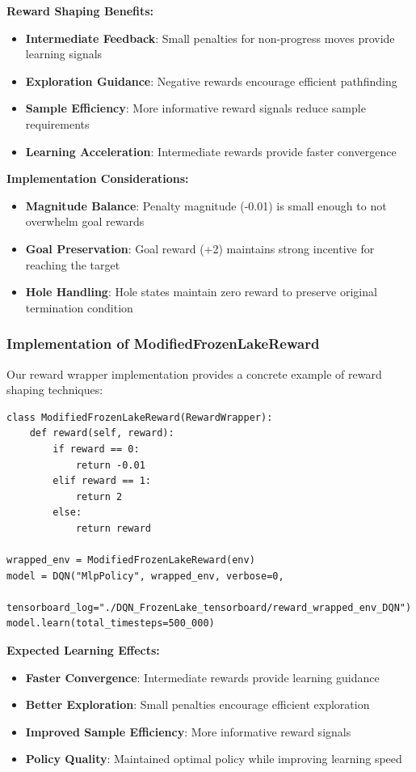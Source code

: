\documentclass[12pt]{article}
\begin{document}
{{{\textbf{Reward Shaping Benefits:}
\begin{itemize}
    \item \textbf{Intermediate Feedback}: Small penalties for non-progress moves provide learning signals
    \item \textbf{Exploration Guidance}: Negative rewards encourage efficient pathfinding
    \item \textbf{Sample Efficiency}: More informative reward signals reduce sample requirements
    \item \textbf{Learning Acceleration}: Intermediate rewards provide faster convergence
\end{itemize}

\textbf{Implementation Considerations:}
\begin{itemize}
    \item \textbf{Magnitude Balance}: Penalty magnitude (-0.01) is small enough to not overwhelm goal rewards
    \item \textbf{Goal Preservation}: Goal reward (+2) maintains strong incentive for reaching the target
    \item \textbf{Hole Handling}: Hole states maintain zero reward to preserve original termination condition
\end{itemize}

\subsubsection{Implementation of ModifiedFrozenLakeReward}

Our reward wrapper implementation provides a concrete example of reward shaping techniques:

\begin{verbatim}
class ModifiedFrozenLakeReward(RewardWrapper):
    def reward(self, reward):
        if reward == 0:            
            return -0.01
        elif reward == 1:           
            return 2
        else:
            return reward

wrapped_env = ModifiedFrozenLakeReward(env)
model = DQN("MlpPolicy", wrapped_env, verbose=0, 
           tensorboard_log="./DQN_FrozenLake_tensorboard/reward_wrapped_env_DQN")
model.learn(total_timesteps=500_000)
\end{verbatim}

\textbf{Expected Learning Effects:}
\begin{itemize}
    \item \textbf{Faster Convergence}: Intermediate rewards provide learning guidance
    \item \textbf{Better Exploration}: Small penalties encourage efficient exploration
    \item \textbf{Improved Sample Efficiency}: More informative reward signals
    \item \textbf{Policy Quality}: Maintained optimal policy while improving learning speed
\end{itemize}

}}}
\end{document}

